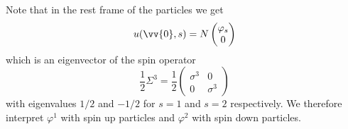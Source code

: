 \documentclass[fleqn]{NotesClass}
\begin{document}
    Note that in the rest frame of the particles we get
    \begin{equation}
        u(\vv{0}, s) = N
        \begin{pmatrix}
            \varphi_s\\ 0
        \end{pmatrix}
    \end{equation}
    which is an eigenvector of the spin operator
    \begin{equation}
        \frac{1}{2}\Sigma^3 = \frac{1}{2}
        \begin{pmatrix}
            \sigma^3 & 0\\
            0 & \sigma^3
        \end{pmatrix}
    \end{equation}
    with eigenvalues \(1/2\) and \(-1/2\) for \(s = 1\) and \(s = 2\) respectively.
    We therefore interpret \(\varphi^1\) with spin up particles and \(\varphi^2\) with spin down particles.
    
\end{document}
